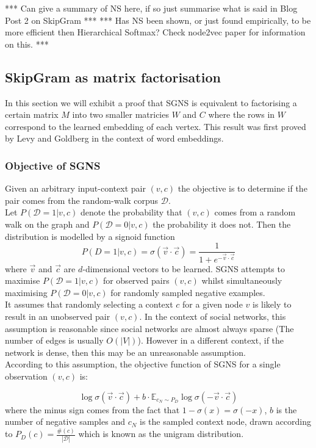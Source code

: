 \documentclass[a4paper]{article}
\renewcommand{\E}{\mathbb E}
\newcommand{\D}{\mathcal D}
\begin{document}
*** Can give a summary of NS here, if so just summarise what is said in Blog
Post 2 on SkipGram ***
*** Has NS been shown, or just found empirically, to be more efficient then
Hierarchical Softmax? Check node2vec paper for information on this. ***

\subsection{SkipGram as matrix factorisation}
In this section we will exhibit a proof that SGNS is
equivalent to factorising a certain matrix $M$ into two smaller matricies $W$
and $C$ where the rows in $W$ correspond to the learned embedding of each vertex. This result was first proved by Levy and
Goldberg\cite{levy&goldberg} in the context of word embeddings.\\
\subsubsection{Objective of SGNS}
Given an arbitrary input-context pair $(v,c)$ the objective is to determine if
the pair comes from the random-walk corpus $\mathcal{D}$.\\
Let $P(\D = 1 | v, c)$ denote the probability that $(v,c)$ comes from a random
walk on the graph and $P(\D = 0| v, c)$
the probability it does not. Then the distribution is modelled by a signoid
function
\[P(D = 1 | v, c) = \sigma(\vec{v} \cdot \vec{c}) = \frac{1}{1 + e^{-\vec{v} \cdot \vec{c}}}\]
where $\vec{v}$ and $\vec{c}$ are $d$-dimensional vectors to be learned. SGNS attempts to maximise $P(\mathcal{D} = 1 | v,c)$ for observed pairs $(v, c)$
whilst simultaneously maximising $P(\D = 0 | v, c)$ for randomly sampled
negative examples.\\
It assumes that randomly selecting a context $c$ for a given
node $v$ is likely to result in an unobserved pair $(v,c)$. In the context of
social networks, this assumption is reasonable since social networks are almost
always sparse (The number of edges is usually $O(|V|)$). However in a different
context, if the network is dense, then this may be an unreasonable assumption.\\

According to this assumption, the objective function of SGNS for a single
observation $(v,c)$ is:

\[\log{\sigma(\vec{v} \cdot \vec{c})} + b \cdot \E_{c_{N} \sim P_D}\log{\sigma(-\vec{v} \cdot \vec{c})}\]
where the minus sign comes from the fact that $1 - \sigma(x) = \sigma(-x)$, $b$
is the number of negative samples and $c_N$ is the sampled context node, drawn
according to $P_D (c) = \frac{\#(c)}{| \D |}$ which is known as the unigram
distribution.\\
\end{document}
